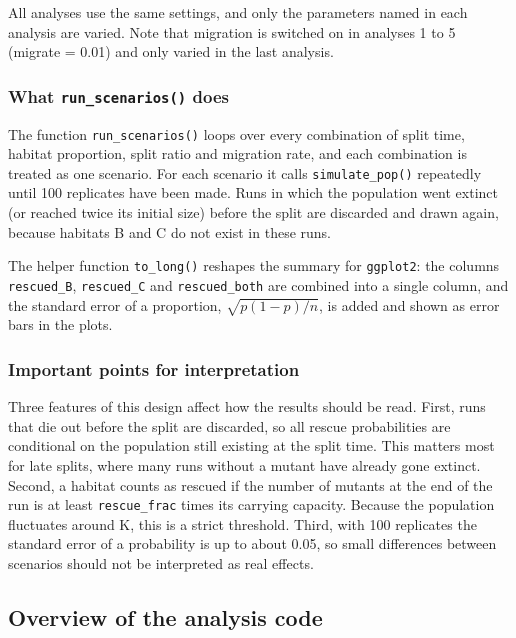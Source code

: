 \documentclass[
]{article}
\begin{document}
All analyses use the same settings, and only the parameters named in
each analysis are varied. Note that migration is switched on in analyses
1 to 5 (migrate = 0.01) and only varied in the last analysis.

\subsubsection{\texorpdfstring{What \texttt{run\_scenarios()}
does}{What run\_scenarios() does}}\label{what-run_scenarios-does}

The function \texttt{run\_scenarios()} loops over every combination of
split time, habitat proportion, split ratio and migration rate, and each
combination is treated as one scenario. For each scenario it calls
\texttt{simulate\_pop()} repeatedly until 100 replicates have been made.
Runs in which the population went extinct (or reached twice its initial
size) before the split are discarded and drawn again, because habitats B
and C do not exist in these runs.

The helper function \texttt{to\_long()} reshapes the summary for
\texttt{ggplot2}: the columns \texttt{rescued\_B}, \texttt{rescued\_C}
and \texttt{rescued\_both} are combined into a single column, and the
standard error of a proportion, \(\sqrt{p(1-p)/n}\), is added and shown
as error bars in the plots.

\subsubsection{Important points for
interpretation}\label{important-points-for-interpretation}

Three features of this design affect how the results should be read.
First, runs that die out before the split are discarded, so all rescue
probabilities are conditional on the population still existing at the
split time. This matters most for late splits, where many runs without a
mutant have already gone extinct. Second, a habitat counts as rescued if
the number of mutants at the end of the run is at least
\texttt{rescue\_frac} times its carrying capacity. Because the
population fluctuates around K, this is a strict threshold. Third, with
100 replicates the standard error of a probability is up to about 0.05,
so small differences between scenarios should not be interpreted as real
effects.

\subsection{Overview of the analysis
code}\label{overview-of-the-analysis-code}
\end{document}
